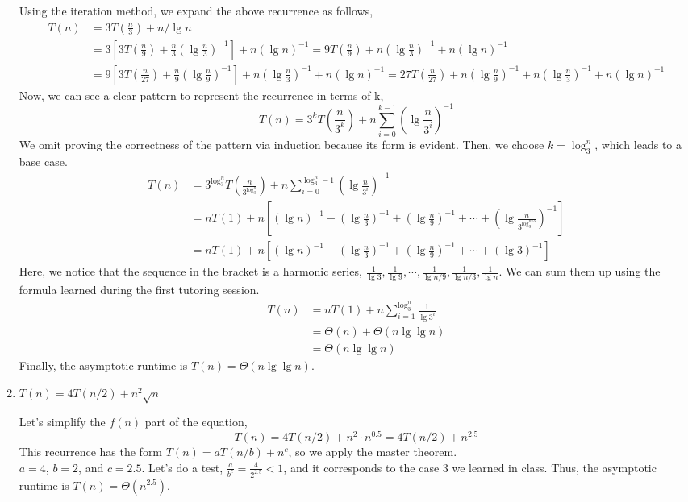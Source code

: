 \documentclass[11pt]{article}
\theoremstyle{definition}
\theoremstyle{theorem}
\newcommand{\solution}{\medskip\noindent{\color{DarkBlue}\textbf{Solution:}}}
\begin{document}
\begin{enumerate}[label=(\alph*)]
Using the iteration method, we expand the above recurrence as follows,
\[
\begin{split}
T(n) &= 3T(\frac{n}{3}) + n / \lg n \\
&= 3[3T(\frac{n}{9}) + \frac{n}{3}(\lg \frac{n}{3})^{-1}] + n (\lg n)^{-1} = 9T(\frac{n}{9}) + n(\lg \frac{n}{3})^{-1} + n (\lg n)^{-1} \\
& = 9[3T(\frac{n}{27}) + \frac{n}{9}(\lg \frac{n}{9})^{-1}] + n(\lg \frac{n}{3})^{-1} + n (\lg n)^{-1} = 27T(\frac{n}{27}) + n(\lg \frac{n}{9})^{-1} + n(\lg \frac{n}{3})^{-1} + n (\lg n)^{-1}
\end{split}
\]
Now, we can see a clear pattern to represent the recurrence in terms of k,
\[
T(n) = 3^k T(\frac{n}{3^k}) + n \sum_{i=0}^{k-1} (\lg \frac{n}{3^i})^{-1}
\]
We omit proving the correctness of the pattern via induction because its form is evident.
Then, we choose $k = \log_3^n$, which leads to a base case.
\[
\begin{split}
T(n) &= 3^{\log_3^n} T(\frac{n}{3^{\log_3^n}}) + n \sum_{i=0}^{\log_3^n -1} (\lg \frac{n}{3^i})^{-1} \\
&=  n T(1) + n [(\lg n)^{-1} + (\lg \frac{n}{3})^{-1} + (\lg \frac{n}{9})^{-1} +  \cdots + (\lg \frac{n}{3^{\log_3^{n/3}}})^{-1}] \\
&= n T(1) + n [(\lg n)^{-1} + (\lg \frac{n}{3})^{-1} + (\lg \frac{n}{9})^{-1} +  \cdots + (\lg 3)^{-1}]
\end{split}
\]
Here, we notice that the sequence in the bracket is a harmonic series, 
$\frac{1}{\lg 3}, \frac{1}{\lg 9}, \cdots, \frac{1}{\lg n/9}, \frac{1}{\lg n/3}, \frac{1}{\lg n}$. We can sum them up using the formula learned during the first tutoring session.
\[
\begin{split}
T(n) &= n T(1) + n \sum_{i = 1}^{\log_3^n} \frac{1}{\lg 3^i} \\
&= \Theta(n) + \Theta(n \lg \lg n) \\
&= \Theta(n \lg \lg n)
\end{split}
\]
Finally, the asymptotic runtime is $T(n) = \Theta(n \lg \lg n)$.

\item $T(n) = 4T(n/2) + n^2 \sqrt{n}$

\solution

Let's simplify the $f(n)$ part of the equation,
\[
T(n) = 4T(n/2) + n^2 \cdot n^{0.5} = 4T(n/2) + n^{2.5}
\]
This recurrence has the form $T(n) = a T(n/b) + n^c$, so we apply the master theorem. \\
$a = 4$, $b = 2$, and $c = 2.5$. 
Let's do a test, $\frac{a}{b^c} = \frac{4}{2^{2.5}} < 1$, and it corresponds to the case 3 we learned in class. 
Thus, the asymptotic runtime is $T(n) = \Theta (n^{2.5})$.


\end{enumerate}
\end{document}
